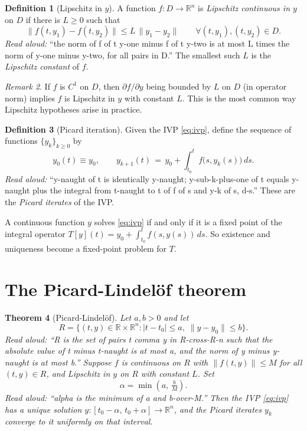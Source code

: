 \documentclass[11pt]{article}
\newtheorem{theorem}{Theorem}
\theoremstyle{definition}
\newtheorem{definition}[theorem]{Definition}
\theoremstyle{remark}
\newtheorem{remark}[theorem]{Remark}
\newcommand{\R}{\mathbb{R}}
\begin{document}
\begin{definition}[Lipschitz in $y$]
  A function $f : D \to \R^n$ is \emph{Lipschitz continuous in $y$} on
  $D$ if there is $L \ge 0$ such that
  \[
    \| f(t, y_1) - f(t, y_2) \| \le L \, \| y_1 - y_2 \|
    \qquad \forall (t, y_1), (t, y_2) \in D.
  \]
  \emph{Read aloud:} ``the norm of f of t y-one minus f of t y-two is at
  most L times the norm of y-one minus y-two, for all pairs in D.''
  The smallest such $L$ is the \emph{Lipschitz constant} of $f$.
\end{definition}

\begin{remark}
  If $f$ is $C^1$ on $D$, then $\partial f / \partial y$ being bounded by
  $L$ on $D$ (in operator norm) implies $f$ is Lipschitz in $y$ with
  constant $L$. This is the most common way Lipschitz hypotheses arise
  in practice.
\end{remark}

\begin{definition}[Picard iteration]
  Given the IVP \eqref{eq:ivp}, define the sequence of functions
  $\{y_k\}_{k \ge 0}$ by
  \[
    y_0(t) \equiv y_0, \qquad
    y_{k+1}(t) \,=\, y_0 + \int_{t_0}^t f\bigl(s, y_k(s)\bigr)\, ds.
  \]
  \emph{Read aloud:} ``y-naught of t is identically y-naught; y-sub-k-plus-one
  of t equals y-naught plus the integral from t-naught to t of f of s and
  y-k of s, d-s.''
  These are the \emph{Picard iterates} of the IVP.
\end{definition}

A continuous function $y$ solves \eqref{eq:ivp} if and only if it is a
fixed point of the integral operator
$T[y](t) = y_0 + \int_{t_0}^t f(s, y(s))\, ds$. So existence and uniqueness
become a fixed-point problem for $T$.

\section{The Picard-Lindel\"of theorem}

\begin{theorem}[Picard-Lindel\"of]
  \label{thm:pl}
  Let $a, b > 0$ and let
  \[
    R = \{ (t, y) \in \R \times \R^n : |t - t_0| \le a, \; \|y - y_0\| \le b \}.
  \]
  \emph{Read aloud:} ``R is the set of pairs t comma y in R-cross-R-n such
  that the absolute value of t minus t-naught is at most a, and the norm
  of y minus y-naught is at most b.''
  Suppose $f$ is continuous on $R$ with $\|f(t, y)\| \le M$ for all
  $(t,y) \in R$, and Lipschitz in $y$ on $R$ with constant $L$. Set
  \[
    \alpha = \min\!\left(a, \, \tfrac{b}{M}\right).
  \]
  \emph{Read aloud:} ``alpha is the minimum of a and b-over-M.''
  Then the IVP \eqref{eq:ivp} has a unique solution
  $y : [t_0 - \alpha, \, t_0 + \alpha] \to \R^n$, and the Picard iterates
  $y_k$ converge to it uniformly on that interval.
\end{theorem}
\end{document}
